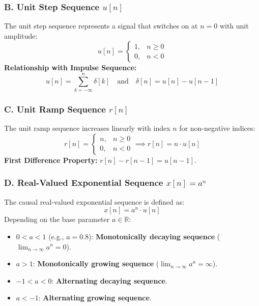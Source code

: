 \documentclass[11pt,a4paper]{article}
\begin{document}
\subsubsection*{B. Unit Step Sequence $u[n]$}
The unit step sequence represents a signal that switches on at $n=0$ with unit amplitude:
\begin{equation}
    u[n] = 
    \begin{cases} 
        1, & n \ge 0 \\ 
        0, & n < 0 
    \end{cases}
\end{equation}
\textbf{Relationship with Impulse Sequence:}
\begin{equation}
    u[n] = \sum_{k=-\infty}^{n} \delta[k] \quad \text{and} \quad \delta[n] = u[n] - u[n-1]
\end{equation}

\subsubsection*{C. Unit Ramp Sequence $r[n]$}
The unit ramp sequence increases linearly with index $n$ for non-negative indices:
\begin{equation}
    r[n] = 
    \begin{cases} 
        n, & n \ge 0 \\ 
        0, & n < 0 
    \end{cases} 
    \implies r[n] = n \cdot u[n]
\end{equation}
\textbf{First Difference Property:} $r[n] - r[n-1] = u[n-1]$.

\subsubsection*{D. Real-Valued Exponential Sequence $x[n] = a^n$}
The causal real-valued exponential sequence is defined as:
\begin{equation}
    x[n] = a^n \cdot u[n]
\end{equation}
Depending on the base parameter $a \in \mathbb{R}$:
\begin{itemize}
    \item $0 < a < 1$ (e.g., $a = 0.8$): \textbf{Monotonically decaying sequence} ($\lim_{n\to\infty} a^n = 0$).
    \item $a > 1$: \textbf{Monotonically growing sequence} ($\lim_{n\to\infty} a^n = \infty$).
    \item $-1 < a < 0$: \textbf{Alternating decaying sequence}.
    \item $a < -1$: \textbf{Alternating growing sequence}.
\end{itemize}
\end{document}
